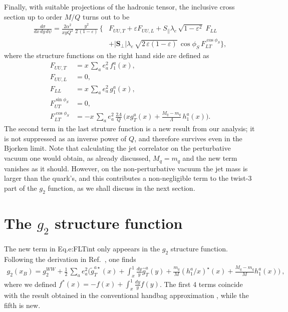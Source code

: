 \documentclass[preprintnumbers,floatfix,nofootinbib]{revtex4}
\newcommand{\xbj}{x}                   %
\newcommand{\mj}{M_q}
\begin{document}
Finally, with suitable projections of the hadronic tensor, the inclusive cross section up to order $M/Q$ turns out to be
\begin{align}
\frac{d\sigma}{d\xbj \, dy\, d\psi}
=
\frac{2 \alpha^2}{\xbj y Q^2}\,
\frac{y^2}{2\,(1-\varepsilon)}\, 
\biggl\{
&F_{UU ,T} + \varepsilon F_{UU ,L}
+ S_\parallel \lambda_e\,
  \sqrt{1-\varepsilon^2}\; 
F_{LL}
\\  
&
+ |\bm{S}_\perp| \lambda_e\, \sqrt{2\,\varepsilon (1-\varepsilon)}\, 
  \cos\phi_S\, 
F_{LT}^{\cos \phi_S}
 \biggr\},
\label{e:crossdis}
\end{align}
where the structure functions on the right hand side are defined as
\begin{align}
F_{UU ,T} &= \xbj\,\sum_a e_a^2\,f_1^a(\xbj),
\\
F_{UU ,L} &= 0,
\\
F_{LL} &=\xbj\,\sum_a e_a^2\,g_1^a(\xbj),
\\
F_{UT}^{\sin \phi_S}&=0,
\label{e:FUTint}
\\
F_{LT}^{\cos \phi_S}&=-\xbj\,\sum_a e_a^2\, \frac{2\Lambda}{Q}\,
\biggl(\xbj  g_T^a(\xbj)
   + \frac{\mj -m_q}{\Lambda} \, h_{1}^a(\xbj) \biggr).
\label{e:FLTint}
\end{align}
The second term in the last struture function is a new result from our
analysis; it is not suppressed as an inverse power of $Q$, and therefore
survives even in the Bjorken limit. Note that calculating the jet correlator
on the perturbative vacuum one would obtain, as already discussed, $\mj=m_q$
and the new term vanishes as it should. However, on the non-perturbative
vacuum the jet mass is larger than the quark's, and this contributes a
non-negligible term to the twist-3 part of the $g_2$ function, as we shall
discuss in the next section.  

 

\section{The $g_2$ structure function}

The new term in Eq.{e:FLTint} only appeears in the $g_2$ structure function. Following the derivation in Ref.~\cite{ABMS}, one finds
\begin{align}
\label{e:g2}
  g_2(x_B) = g_2^{WW} + \frac{1}{2}\,\sum_a e_a^2
\biggl(
    \widetilde g_T^{a \star}(x) 
    + \int_x^1\frac{dy}{y} \widehat{g}_T^a(y) 
    + \frac{m_q}{M} (h_1^a/x)^\star(x) 
    + \frac{\mj-m_q}{M} h_1^a(x) 
\Biggr) \ ,
\end{align}
where we defined $f^*(x) = -f(x) + \int_x^1\frac{dy}{y} f(y)$. The first 4
terms coincide with the result obtained in the conventional handbag
approximation \cite{ABMS}, while the fifth is new. 
\end{document}
